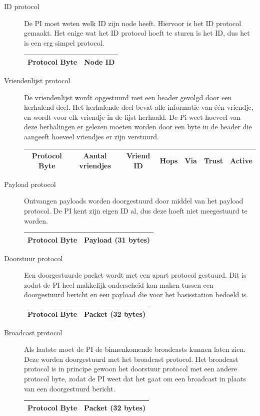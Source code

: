 \begin{description}

\item[ID protocol] De PI moet weten welk ID zijn node heeft. Hiervoor is het ID protocol gemaakt. Het enige wat het ID protocol hoeft te sturen is het ID, dus het is een erg simpel protocol.\\
\begin{tabular}{ |c|c| } 
    \hline
    Protocol Byte & Node ID \\ 
    \hline
\end{tabular}


\item[Vriendenlijst protocol] De vriendenlijst wordt opgestuurd met een header gevolgd door een herhalend deel. Het herhalende deel bevat alle informatie van één vriendje, en wordt voor elk vriendje in de lijst herhaald. De Pi weet hoeveel van deze herhalingen er gelezen moeten worden door een byte in de header die aangeeft hoeveel vriendjes er zijn verstuurd.\\
\begin{tabular}{ |c|c||c|c|c|c|c| } 
    \hline
    Protocol Byte & Aantal vriendjes & Vriend ID & Hops & Via & Trust & Active \\ 
    \hline
\end{tabular}

\item[Payload protocol] Ontvangen payloads worden doorgestuurd door middel van het payload protocol. De PI kent zijn eigen ID al, dus deze hoeft niet meegestuurd te worden.\\
\begin{tabular}{ |c|c| } 
    \hline
    Protocol Byte & Payload (31 bytes) \\ 
    \hline
\end{tabular}

\item[Doorstuur protocol] Een doorgestuurde packet wordt met een apart protocol gestuurd. Dit is zodat de PI heel makkelijk onderscheid kan maken tussen een doorgestuurd bericht en een payload die voor het basisstation bedoeld is.\\
\begin{tabular}{ |c|c| } 
    \hline
    Protocol Byte & Packet (32 bytes) \\ 
    \hline
\end{tabular}


\item[Broadcast protocol] Als laatste moet de PI de binnenkomende broadcasts kunnen laten zien. Deze worden doorgestuurd met het broadcast protocol. Het broadcast protocol is in principe gewoon het doorstuur protocol met een andere protocol byte, zodat de PI weet dat het gaat om een broadcast in plaats van een doorgestuurd bericht.\\
\begin{tabular}{ |c|c| } 
    \hline
    Protocol Byte & Packet (32 bytes) \\ 
    \hline
\end{tabular}

\end{description}

